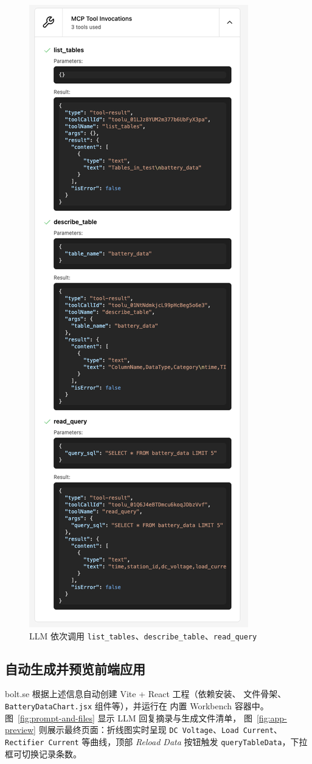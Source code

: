 \begin{figure}[htbp]
  \centering
  \includegraphics[width=.5\textwidth]{figures/screenshots/iotdb-demo/mcp-call.png}
  \caption{LLM 依次调用 \texttt{list\_tables}、\texttt{describe\_table}、\texttt{read\_query}}
  \label{fig:mcp-call}
\end{figure}

\subsection{自动生成并预览前端应用}

bolt.se 根据上述信息自动创建 Vite + React 工程（依赖安装、
文件骨架、\texttt{BatteryDataChart.jsx} 组件等），并运行在
内置 Workbench 容器中。  
图~\ref{fig:prompt-and-files} 显示 LLM 回复摘录与生成文件清单，
图~\ref{fig:app-preview} 则展示最终页面：折线图实时呈现
\texttt{DC Voltage}、\texttt{Load Current}、\texttt{Rectifier Current}
等曲线，顶部 \textit{Reload Data} 按钮触发
\texttt{queryTableData}，下拉框可切换记录条数。

